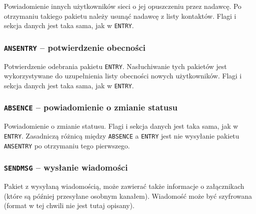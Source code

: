 \documentclass[11pt,leqno]{article}
\begin{document}
Powiadomienie innych użytkowników sieci o jej opuszczeniu przez nadawcę. Po otrzymaniu
takiego pakietu należy usunąć nadawcę z listy kontaktów. Flagi i sekcja danych jest
taka sama, jak w \texttt{ENTRY}.

\subsubsection{\textnormal{\texttt{ANSENTRY}} -- potwierdzenie obecności}

Potwierdzenie odebrania pakietu \texttt{ENTRY}. Nasłuchiwanie tych pakietów jest
wykorzystywane do uzupełnienia listy obecności nowych użytkowników.
Flagi i sekcja danych jest taka sama, jak w \texttt{ENTRY}.

\subsubsection{\textnormal{\texttt{ABSENCE}} -- powiadomienie o zmianie statusu}

Powiadomienie o zmianie statusu. Flagi i sekcja danych jest taka sama, jak w \texttt{ENTRY}.
Zasadniczą różnicą między \texttt{ABSENCE} a \texttt{ENTRY} jest nie wysyłanie pakietu
\texttt{ANSENTRY} po otrzymaniu tego pierwszego.


\subsubsection{\textnormal{\texttt{SENDMSG}} -- wysłanie wiadomości}\label{sec:udpPackets:sendMsg}

Pakiet z wysyłaną wiadomością, może zawierać także informacje o załącznikach (które są później
przesyłane osobnym kanałem). Wiadomość może być szyfrowana (format w tej chwili nie jest tutaj
opisany).
\end{document}

